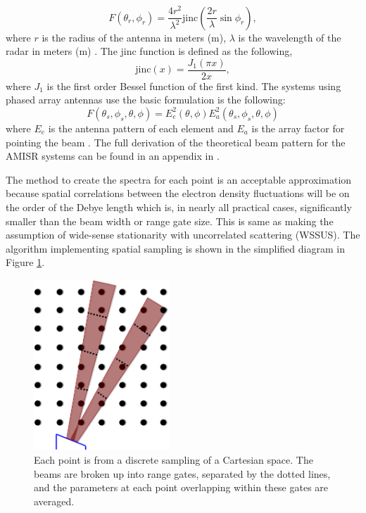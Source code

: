 \documentclass[draft,ras]{agutex}
\begin{document}
\begin{article}
\begin{equation}
\label{eqn:circantenna}
F(\theta_r,\phi_r)=\frac{4r^2}{\lambda^2}\text{jinc}\left(\frac{2r}{\lambda}\sin{\phi_r}\right),
\end{equation}
where $r$ is the radius of the antenna in meters (m), $\lambda$ is the wavelength of the radar in meters (m) \citep{Blahut:2004wd}. The jinc function is defined as the following,
\begin{equation}
\label{eqn:jinc}
\text{jinc}(x)=\frac{J_1(\pi x)}{2x},
\end{equation}
where $J_1$ is the first order Bessel function of the first kind. The systems using phased array antennas use the basic formulation is the following:
\begin{equation}
\label{eqn:phasdarr}
F(\theta_s,\phi_s,\theta,\phi)= E_e^2(\theta,\phi)E_a^2(\theta_s,\phi_s,\theta,\phi)
\end{equation}
where $E_e$ is the antenna pattern of each element and $E_a$ is the array factor for pointing the beam \citep{Balanis:2005:ATA:1208379}. The full derivation of the theoretical beam pattern for the AMISR systems can be found in an appendix in \citet{RDS:RDS20236}.


The method to create the spectra for each point is an acceptable approximation because spatial correlations between the electron density fluctuations will be on the order of the Debye length \citep{farley1969} which is, in nearly all practical cases, significantly smaller than the beam width or range gate size. This is same as making the assumption of wide-sense stationarity with uncorrelated scattering (WSSUS)\citep{Kailath:1962jx}. The algorithm implementing spatial sampling is shown in the simplified diagram in Figure \ref{fig:beamdia}.

\begin{figure}[!t]
\centering
\includegraphics[width=2in]{beamsampling}
\caption{Each point is from a discrete sampling of a Cartesian space. The beams are broken up into range gates, separated by the dotted lines, and the parameters at each point overlapping within these gates are averaged.}
\label{fig:beamdia}
\end{figure}
 



\end{article}
\end{document}

